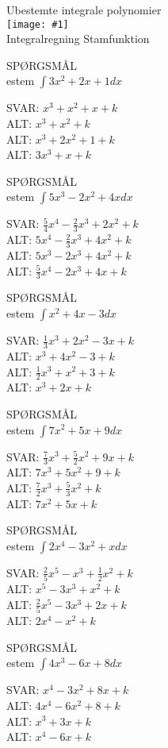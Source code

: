 \documentclass[]{article}
\newcounter{spgcounter}
\newenvironment{question}[2]{\addtocounter{spgcounter}{1} SPØRGSMÅL \thespgcounter\\}{\hspace{50px}}
\newcommand{\name}[1]{{\huge #1}\\}
\newcommand{\tag}[1]{#1}
\newcommand{\cover}[1]{\texttt{[image: \#1]}\\}
\newcommand{\answer}[1]{{\color{green} SVAR: #1}\\}
\newcommand{\alt}[1]{{\color{red} ALT: #1}\\}
\begin{document}
\name{Ubestemte integrale polynomier}
\cover{integralepolynomier.png}
\tag{Integralregning}
\tag{Stamfunktion}

\begin{question}{multi}

Bestem $\int{3x^2+2x+1} dx$

\answer{$x^3 + x^2 + x + k$}
\alt{$x^3 + x^2 + k$}
\alt{$x^3 + 2x^2 + 1 + k$}
\alt{$3x^3 + x + k$}

\end{question}

\begin{question}{multi}

Bestem $\int{5x^3 - 2x^2 + 4x} dx$

\answer{$\frac{5}{4}x^4 - \frac{2}{3}x^3 + 2x^2 + k$}
\alt{$5x^4 - \frac{2}{3}x^3 + 4x^2 + k$}
\alt{$5x^3 - 2x^3 + 4x^2 + k$}
\alt{$\frac{5}{3}x^4 - 2x^3 + 4x + k$}

\end{question}

\begin{question}{multi}

Bestem $\int{x^2 + 4x - 3} dx$

\answer{$\frac{1}{3}x^3 + 2x^2 - 3x + k$}
\alt{$x^3 + 4x^2 - 3 + k$}
\alt{$\frac{1}{2}x^3 + x^2 + 3 + k$}
\alt{$x^3 + 2x + k$}

\end{question}

\begin{question}{multi}

Bestem $\int{7x^2 + 5x + 9} dx$

\answer{$\frac{7}{3}x^3 + \frac{5}{2}x^2 + 9x + k$}
\alt{$7x^3 + 5x^2 + 9 + k$}
\alt{$\frac{7}{2}x^3 + \frac{5}{3}x^2 + k$}
\alt{$7x^2 + 5x + k$}

\end{question}

\begin{question}{multi}

Bestem $\int{2x^4 - 3x^2 + x} dx$

\answer{$\frac{2}{5}x^5 - x^3 + \frac{1}{2}x^2 + k$}
\alt{$x^5 - 3x^3 + x^2 + k$}
\alt{$\frac{2}{5}x^5 - 3x^3 + 2x + k$}
\alt{$2x^4 - x^2 + k$}

\end{question}

\begin{question}{multi}

Bestem $\int{4x^3 - 6x + 8} dx$

\answer{$x^4 - 3x^2 + 8x + k$}
\alt{$4x^4 - 6x^2 + 8 + k$}
\alt{$x^3 + 3x + k$}
\alt{$x^4 - 6x + k$}

\end{question}
\end{document}
